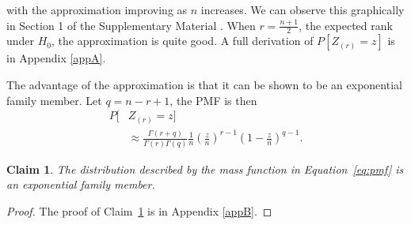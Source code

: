 \documentclass[12pt]{article}
\theoremstyle{plain}
\newtheorem{claim}[axiom]{Claim}
\begin{document}
with the approximation improving as $n$ increases. We can observe this graphically in Section 1 of the Supplementary Material \citep{DRTSup2023}. When $r = \frac{n+1}{2}$, the expected rank under $H_0$, the approximation is quite good. A full derivation of $P\left[ Z_{(r)} = z \right]$ is in Appendix \ref{appA}. 

The advantage of the approximation is that it can be shown to be an exponential family member. Let $q = n-r +1$, the PMF is then
\begin{align}
	P\bigg[ &Z_{(r)} = z \bigg] \label{eq:pmf}\\
	&\approx \frac{\Gamma(r + q)}{\Gamma(r)\Gamma(q)}  \frac{1}{n} \left(\frac{z}{n}\right)^{r-1}\left(1-\frac{z}{n}\right)^{q-1}.\nonumber
\end{align}


\begin{claim}\label{cl1}
The distribution described by the mass function in Equation~\ref{eq:pmf} is an exponential family member.
\end{claim}

\begin{proof}
The proof of Claim~\ref{cl1} is in Appendix \ref{appB}.
\end{proof}
\end{document}
